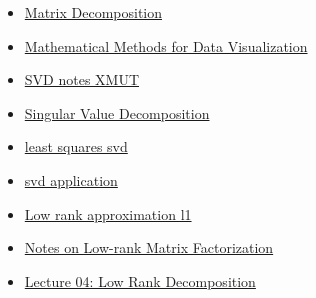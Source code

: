 \begin{itemize}
    \item \href{http://users.ece.northwestern.edu/~mya671/files/Matrix_YM_.pdf}{Matrix Decomposition}
    \item \href{https://www.sjsu.edu/faculty/guangliang.chen/Math253S20.html}{Mathematical Methods for Data Visualization}
    \item \href{https://kuidu.github.io/nla/nla02.pdf}{SVD notes XMUT}
    \item \href{https://people.cas.uab.edu/~mosya/teaching/660new3.pdf}{Singular Value Decomposition}
    \item \href{https://www2.math.uconn.edu/~leykekhman/courses/MATH3795/Lectures/Lecture_9_Linear_least_squares_SVD.pdf}{least squares svd}
    \item \href{https://math.ucsd.edu/sites/math.ucsd.edu/files/undergrad/honors-program/honors-theses/2017-2018/Zecheng_Kuang_Honors_Thesis.pdf}{svd application}
    \item \href{https://www.epfl.ch/labs/anchp/wp-content/uploads/2018/10/lecture1-slides.pdf}{Low rank approximation l1}
    \item \href{https://arxiv.org/pdf/1507.00333.pdf}{Notes on Low-rank Matrix Factorization}
    \item \href{https://appsrv.cse.cuhk.edu.hk/~byu/CMSC5743/2021Fall/slides/Lec04-decomp.pdf}{Lecture 04: Low Rank Decomposition}
\end{itemize}

